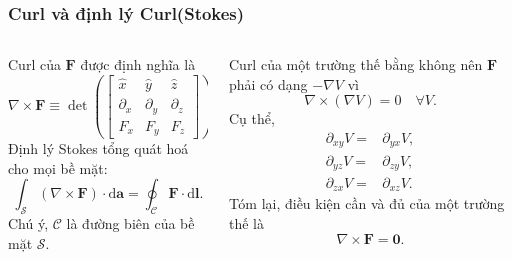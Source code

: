 \begin{frame}
    \frametitle{Curl và định lý Curl(Stokes)}
    \begin{columns}
        \begin{column}{0.5\textwidth}
            \scriptsize
            Curl của \(\mathbf{F}\) được định nghĩa là
            \[\nabla\times\mathbf{F}\equiv \det\left(\begin{bmatrix}
                \hat{x} & \hat{y} & \hat{z}\\
                \partial_x & \partial_y & \partial_z\\
                F_x & F_y & F_z
            \end{bmatrix}\right).\]
            Định lý Stokes tổng quát hoá cho mọi bề mặt:
            \begin{equation*}
                \int_{\mathcal{S}}(\nabla\times\mathbf{F})\cdot\text{d}\mathbf{a}=\oint_{\mathcal{C}}\mathbf{F}\cdot\text{d}\mathbf{l}.
            \end{equation*}
            Chú ý, \(\mathcal{C}\) là đường biên của bề mặt \(\mathcal{S}\).
        \end{column}
        \begin{column}{0.5\textwidth}
            \scriptsize
            Curl của một trường thế bằng không nên \(\mathbf{F}\) phải có dạng \(-\nabla V\) vì
            \[\nabla\times(\nabla V)=0 \quad\forall V.\]
            Cụ thể,
            \begin{align*}
                \partial_{xy}V=&\partial_{yx}V,\\
                \partial_{yz}V=&\partial_{zy}V,\\
                \partial_{zx}V=&\partial_{xz}V.   
            \end{align*}
            Tóm lại, điều kiện cần và đủ của một trường thế là \[\nabla\times \mathbf{F}=\mathbf{0}.\]
        \end{column}
    \end{columns}
\end{frame}
